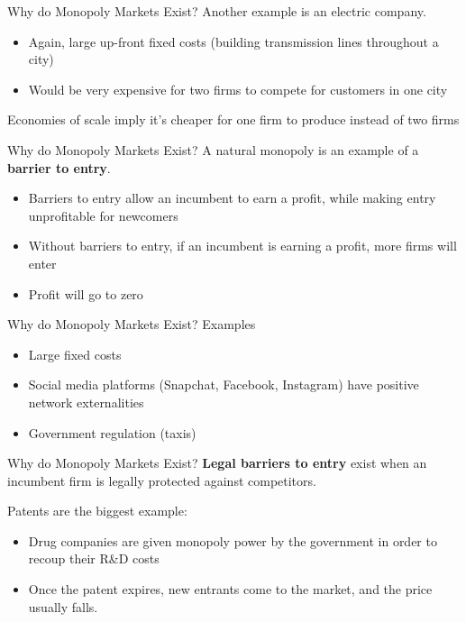 \documentclass{beamer}
\begin{document}
\begin{frame}{Why do Monopoly Markets Exist?}
  Another example is an electric company.

  \begin{itemize}
    \item Again, large up-front fixed costs (building transmission lines throughout a city)
    \item Would be very expensive for two firms to compete for customers in one city
  \end{itemize}

  \bigskip
  Economies of scale imply it's cheaper for one firm to produce instead of two firms
\end{frame}

\begin{frame}{Why do Monopoly Markets Exist?}
  A natural monopoly is an example of a \textbf{barrier to entry}.
  
  \begin{itemize}
    \item Barriers to entry allow an incumbent to earn a profit, while making entry unprofitable for newcomers
    \item Without barriers to entry, if an incumbent is earning a profit, more firms will enter
    \item Profit will go to zero
  \end{itemize}
\end{frame}

\begin{frame}{Why do Monopoly Markets Exist?}
  Examples

  \begin{itemize}
    \item Large fixed costs 
    \item Social media platforms (Snapchat, Facebook, Instagram) have positive network externalities
    \item Government regulation (taxis)
  \end{itemize}
\end{frame}

\begin{frame}{Why do Monopoly Markets Exist?}
  \textbf{Legal barriers to entry} exist when an incumbent firm is legally protected against competitors.

  \bigskip
  Patents are the biggest example:

  \begin{itemize}
    \item Drug companies are given monopoly power by the government in order to recoup their R\&D costs
    \item Once the patent expires, new entrants come to the market, and the price usually falls.
  \end{itemize}
\end{frame}
\end{document}

